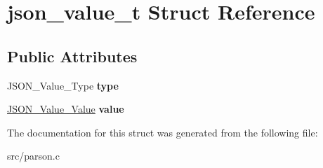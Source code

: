 \hypertarget{structjson__value__t}{\section{json\-\_\-value\-\_\-t Struct Reference}
\label{structjson__value__t}
}
\subsection*{Public Attributes}
\begin{DoxyCompactItemize}
\item 
\hypertarget{structjson__value__t_a2542a563b2a035c4be090360dbd31174}{J\-S\-O\-N\-\_\-\-Value\-\_\-\-Type {\bfseries type}}\label{structjson__value__t_a2542a563b2a035c4be090360dbd31174}

\item 
\hypertarget{structjson__value__t_aed94ef4fcdc948dff1b51656074eae25}{\hyperlink{unionjson__value__value}{J\-S\-O\-N\-\_\-\-Value\-\_\-\-Value} {\bfseries value}}\label{structjson__value__t_aed94ef4fcdc948dff1b51656074eae25}

\end{DoxyCompactItemize}


The documentation for this struct was generated from the following file\-:\begin{DoxyCompactItemize}
\item 
src/parson.\-c\end{DoxyCompactItemize}
